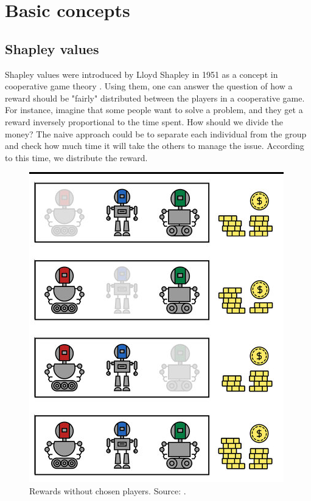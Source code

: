 \documentclass[magisterska,en]{pracamgr}
\begin{document}
\chapter{Basic concepts}\label{r:concepts}


\section{Shapley values}
Shapley values were introduced by Lloyd Shapley in 1951 as a concept in cooperative game theory \cite{ShapleyValues}.
Using them, one can answer the question of how a reward should be "fairly" distributed between the players in a cooperative game. For instance, imagine that some people want to solve a problem, and they get a reward inversely proportional to the time spent. How should we divide the money? The naive approach could be to separate each individual from the group and check how much time it will take the others to manage the issue. According to this time, we distribute the reward.

\begin{figure}[H]
\centering
\includegraphics[scale=0.3]{./images/Shap_coal_2.png}
\caption{Rewards without chosen players. Source: \cite{DBLP:conf/ijcai/RozemberczkiWBY22}.}
\end{figure}
\end{document}
